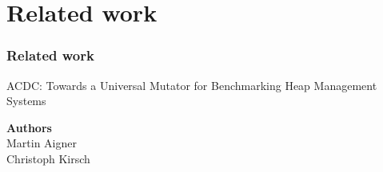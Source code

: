 %
%
\section{Related work}	
\begin{frame}
	\frametitle{Related work}
	ACDC: Towards a Universal Mutator for
	Benchmarking Heap Management Systems \\

	\bigskip

	\textbf{Authors} \\
	Martin Aigner \\ 
	Christoph Kirsch \\

	\bigskip

\end{frame}